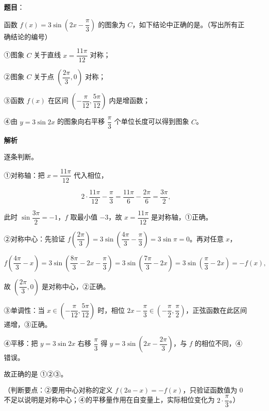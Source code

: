 \begin{answer}

\textbf{题目}：

函数 $f(x)=3\sin\left(2x-\dfrac{\pi}{3}\right)$ 的图象为 $C$，如下结论中正确的是\gkblank{}。（写出所有正确结论的编号）

①图象 $C$ 关于直线 $x=\dfrac{11\pi}{12}$ 对称；

②图象 $C$ 关于点 $\left(\dfrac{2\pi}{3},0\right)$ 对称；

③函数 $f(x)$ 在区间 $\left(-\dfrac{\pi}{12},\dfrac{5\pi}{12}\right)$ 内是增函数；

④由 $y=3\sin2x$ 的图象向右平移 $\dfrac{\pi}{3}$ 个单位长度可以得到图象 $C$。

\textbf{解析}

逐条判断。

①对称轴：把 $x=\dfrac{11\pi}{12}$ 代入相位，

\nopagebreak[4]
\[2\cdot\frac{11\pi}{12}-\frac{\pi}{3}=\frac{11\pi}{6}-\frac{2\pi}{6}=\frac{3\pi}{2},\]

此时 $\sin\dfrac{3\pi}{2}=-1$，$f$ 取最小值 $-3$，故 $x=\dfrac{11\pi}{12}$ 是对称轴，①正确。

②对称中心：先验证 $f\left(\dfrac{2\pi}{3}\right)=3\sin\left(\dfrac{4\pi}{3}-\dfrac{\pi}{3}\right)=3\sin\pi=0$。再对任意 $x$，

\nopagebreak[4]
\[f\left(\frac{4\pi}{3}-x\right)=3\sin\left(\frac{8\pi}{3}-2x-\frac{\pi}{3}\right)=3\sin\left(\frac{7\pi}{3}-2x\right)=3\sin\left(\frac{\pi}{3}-2x\right)=-f(x),\]

故 $\left(\dfrac{2\pi}{3},0\right)$ 是对称中心，②正确。

③单调性：当 $x\in\left(-\dfrac{\pi}{12},\dfrac{5\pi}{12}\right)$ 时，相位 $2x-\dfrac{\pi}{3}\in\left(-\dfrac{\pi}{2},\dfrac{\pi}{2}\right)$，正弦函数在此区间递增，③正确。

④平移：把 $y=3\sin2x$ 右移 $\dfrac{\pi}{3}$ 得 $y=3\sin\left(2x-\dfrac{2\pi}{3}\right)$，与 $f$ 的相位不同，④错误。

故正确的是 ①②③。

（判断要点：②要用中心对称的定义 $f(2a-x)=-f(x)$，只验证函数值为 $0$ 不足以说明是对称中心；④的平移量作用在自变量上，实际相位变化为 $2\cdot\dfrac{\pi}{3}$。）


\end{answer}

